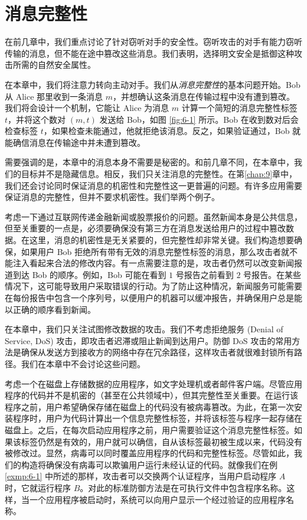 \chapter{消息完整性}\label{chap:6}

在前几章中，我们重点讨论了针对窃听对手的安全性。窃听攻击的对手有能力窃听传输的消息，但不能在途中篡改这些消息。我们表明，选择明文安全是抵御这种攻击所需的自然安全属性。

在本章中，我们将注意力转向主动对手。我们从\emph{消息完整性}的基本问题开始。Bob 从 Alice 那里收到一条消息 $m$，并想确认这条消息在传输过程中没有遭到篡改。我们将会设计一个机制，它能让 Alice 为消息 $m$ 计算一个简短的消息完整性标签 $t$，并将这个数对 $(m,t)$ 发送给 Bob，如图 \ref{fig:6-1} 所示。Bob 在收到数对后会检查标签 $t$，如果检查未能通过，他就拒绝该消息。反之，如果验证通过，Bob 就能确信消息在传输途中并未遭到篡改。

需要强调的是，本章中的消息本身不需要是秘密的。和前几章不同，在本章中，我们的目标并不是隐藏信息。相反，我们只关注消息的完整性。在第\ref{chap:9}章中，我们还会讨论同时保证消息的机密性和完整性这一更普遍的问题。有许多应用需要保证消息的完整性，但并不要求机密性。我们举两个例子。

\begin{example}\label{exmp:6-1}
考虑一下通过互联网传递金融新闻或股票报价的问题。虽然新闻本身是公共信息，但至关重要的一点是，必须要确保没有第三方在消息发送给用户的过程中篡改数据。在这里，消息的机密性是无关紧要的，但完整性却非常关键。我们构造想要确保，如果用户 Bob 拒绝所有带有无效的消息完整性标签的消息，那么攻击者就不能注入看起来合法的修改内容。有一点需要注意的是，攻击者仍然可以改变新闻报道到达 Bob 的顺序。例如，Bob 可能在看到 $1$ 号报告之前看到 $2$ 号报告。在某些情况下，这可能导致用户采取错误的行动。为了防止这种情况，新闻服务可能需要在每份报告中包含一个序列号，以便用户的机器可以缓冲报告，并确保用户总是能以正确的顺序看到新闻。
\end{example}

在本章中，我们只关注试图修改数据的攻击。我们不考虑拒绝服务 (Denial of Service, DoS) 攻击，即攻击者迟滞或阻止新闻到达用户。防御 DoS 攻击的常用方法是确保从发送方到接收方的网络中存在冗余路径，这样攻击者就很难封锁所有路径。我们在本章中不会讨论这些问题。

\begin{example}\label{exmp:6-2}
考虑一个在磁盘上存储数据的应用程序，如文字处理机或者邮件客户端。尽管应用程序的代码并不是机密的（甚至在公共领域中），但其完整性至关重要。在运行该程序之前，用户希望确保存储在磁盘上的代码没有被病毒篡改。为此，在第一次安装程序时，用户为代码计算出一个信息完整性标签，并将该标签与程序一起存储在磁盘上。之后，在每次启动应用程序之前，用户需要验证这个消息完整性标签。如果该标签仍然是有效的，用户就可以确信，自从该标签最初被生成以来，代码没有被修改过。显然，病毒可以同时覆盖应用程序的代码和完整性标签。尽管如此，我们的构造将确保没有病毒可以欺骗用户运行未经认证的代码。就像我们在例 \ref{exmp:6-1} 中所述的那样，攻击者可以交换两个认证程序，当用户启动程序 $A$ 时，它就运行程序 $B$。对此的标准防御方法是在可执行文件中包含程序名称。这样，当一个应用程序被启动时，系统可以向用户显示一个经过验证的应用程序名称。
\end{example}

